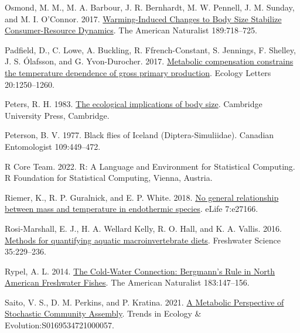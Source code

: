 \documentclass[
]{article}
\newlength{\cslhangindent}
\newlength{\cslentryspacingunit} %
\newenvironment{CSLReferences}[2] %
 {%
  \setlength{\parindent}{0pt}
  \ifodd #1
  \let\oldpar\par
  \def\par{\hangindent=\cslhangindent\oldpar}
  \fi
  \setlength{\parskip}{#2\cslentryspacingunit}
 }%
 {}
\numberwithin{equation}
\begin{document}
\begin{CSLReferences}{1}{0}
\leavevmode{}%
Osmond, M. M., M. A. Barbour, J. R. Bernhardt, M. W. Pennell, J. M.
Sunday, and M. I. O'Connor. 2017.
\href{https://doi.org/10.1086/691387}{Warming-{Induced Changes} to {Body
Size Stabilize Consumer-Resource Dynamics}}. The American Naturalist
189:718--725.

\leavevmode{}%
Padfield, D., C. Lowe, A. Buckling, R. Ffrench-Constant, S. Jennings, F.
Shelley, J. S. Ólafsson, and G. Yvon-Durocher. 2017.
\href{https://doi.org/10.1111/ele.12820}{Metabolic compensation
constrains the temperature dependence of gross primary production}.
Ecology Letters 20:1250--1260.

\leavevmode{}%
Peters, R. H. 1983. \href{https://doi.org/10.1017/CBO9780511608551}{The
ecological implications of body size}. Cambridge University Press,
Cambridge.

\leavevmode{}%
Peterson, B. V. 1977. Black flies of {Iceland} ({Diptera-Simuliidae}).
Canadian Entomologist 109:449--472.

\leavevmode{}%
R Core Team. 2022. R: {A Language} and {Environment} for {Statistical
Computing}. R Foundation for Statistical Computing, Vienna, Austria.

\leavevmode{}%
Riemer, K., R. P. Guralnick, and E. P. White. 2018.
\href{https://doi.org/10.7554/eLife.27166}{No general relationship
between mass and temperature in endothermic species}. eLife 7:e27166.

\leavevmode{}%
Rosi-Marshall, E. J., H. A. Wellard Kelly, R. O. Hall, and K. A. Vallis.
2016. \href{https://doi.org/10.1086/684648}{Methods for quantifying
aquatic macroinvertebrate diets}. Freshwater Science 35:229--236.

\leavevmode{}%
Rypel, A. L. 2014. \href{https://doi.org/10.1086/674094}{The {Cold-Water
Connection}: {Bergmann}'s {Rule} in {North American Freshwater Fishes}}.
The American Naturalist 183:147--156.

\leavevmode{}%
Saito, V. S., D. M. Perkins, and P. Kratina. 2021.
\href{https://doi.org/10.1016/j.tree.2021.01.003}{A {Metabolic
Perspective} of {Stochastic Community Assembly}}. Trends in Ecology \&
Evolution:S0169534721000057.


\end{CSLReferences}
\end{document}
